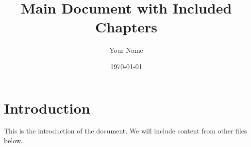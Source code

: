 \documentclass{article}
\title{Main Document with Included Chapters}
\author{Your Name}
\date{\today}
\begin{document}
\maketitle

\section{Introduction}
This is the introduction of the document. We will include content from other files below.


\end{document}
